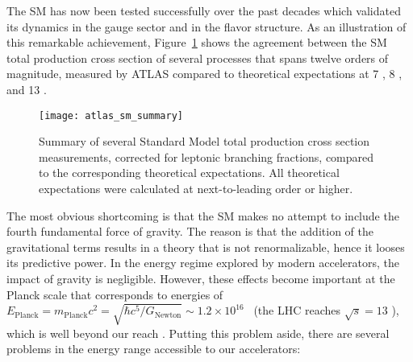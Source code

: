 The SM has now been tested successfully over the past decades which validated its dynamics in the gauge sector and in the flavor structure.
As an illustration of this remarkable achievement, Figure~\ref{fig:theory.sm.summary} shows the agreement between the SM total production cross section
of several processes that spans twelve orders of magnitude, 
measured by ATLAS compared to theoretical expectations 
at 7 \TeV, 8 \TeV, and 13 \TeV.
\begin{figure}[htb!]
\centering
\texttt{[image: atlas\_sm\_summary]}
\caption{Summary of several Standard Model total production cross section measurements, corrected for leptonic branching fractions, 
compared to the corresponding theoretical expectations. All theoretical expectations were calculated at next-to-leading order or higher.}
\label{fig:theory.sm.summary}
\end{figure} 
The most obvious shortcoming is that the SM makes no attempt to include the fourth fundamental force of gravity. 
The reason is that the addition of the gravitational terms results in a theory that is not renormalizable, hence 
it looses its predictive power.
In the energy regime explored by modern accelerators, the impact of gravity is negligible. 
However, these effects become important at the Planck scale that corresponds to energies of 
$E_\text{Planck} = m_\text{Planck} c^2 = \sqrt{\hbar c^5/G_\text{Newton}} \sim 1.2 \times 10^{16}$ \TeV~(the LHC reaches $\sqrt{s}=13$ \TeV), 
which is well beyond our reach \cite{Ade:2013zuv}. 
Putting this problem aside, there are several problems in the energy range accessible to our accelerators:
